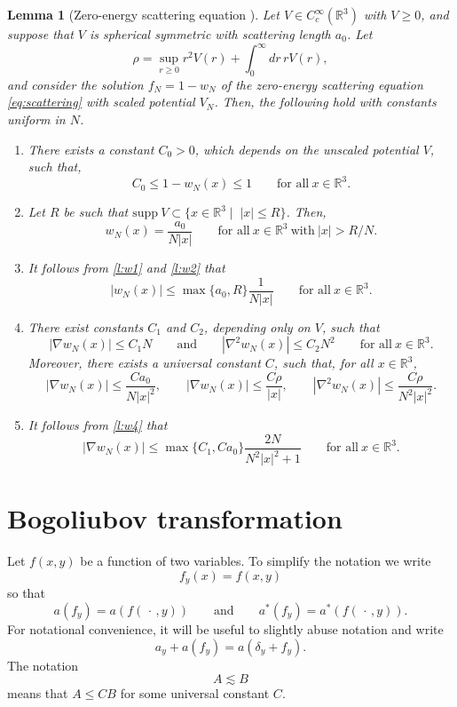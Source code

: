 \documentclass[11pt,a4paper]{scrartcl}
\newtheorem{lem}[thm]{Lemma}
\newcommand{\R}{\mathds{R}}
\begin{document}
\begin{lem}[Zero-energy scattering equation \cite{ESY2010}] \label{l:w}
  Let $V \in C_c^\infty(\R^3)$ with $V \ge 0$, and suppose that $V$ is
  spherical symmetric with scattering length $a_0$. Let
  \[
    \rho = \sup_{r \ge 0} r^2 V(r) + \int_0^\infty dr \, r V(r),
  \]
  and consider the solution $f_N = 1-w_N$ of the zero-energy scattering
  equation \eqref{eq:scattering} with scaled potential $V_N$. Then, the
  following hold with constants uniform in $N$.
  \begin{enumerate}
    \item \label{l:w1} There exists a constant $C_0 > 0$, which depends on the
      unscaled potential $V$, such that,
      \[
        C_0 \le 1 - w_N(x) \le 1 \qquad \text{for all} \ x \in \R^3.
      \]
    \item \label{l:w2} Let $R$ be such that $\text{supp} \ V \subset \{ x \in
      \R^3 \; | \;\; |x| \le R \}$. Then,
      \[
        w_N(x) = \frac{a_0}{N|x|} \qquad \text{for all} \ x \in \R^3 \
        \text{with} \ |x| > R/N.
      \]
    \item \label{l:w3} It follows from \ref{l:w1} and \ref{l:w2} that
      \[
        |w_N(x)| \le \max\{a_0, R\} \frac{1}{N|x|} \qquad \text{for all} \ x
        \in \R^3.
      \]
    \item \label{l:w4} There exist constants $C_1$ and $C_2$, depending only on
      $V$, such that
      \[
        |\nabla w_N(x)| \le C_1 N \qquad \text{and} \qquad | \nabla^2 w_N(x)|
        \le C_2 N^2 \qquad \text{for all} \ x \in \R^3.
      \]
      Moreover, there exists a universal constant $C$, such that, for all $x
      \in \R^3$,
      \[
        |\nabla w_N(x)| \le \frac{C a_0}{N |x|^2}, \qquad |\nabla w_N(x)| \le
        \frac{C \rho}{|x|}, \qquad |\nabla^2 w_N(x)| \le \frac{C \rho}{N^2
        |x|^2}.
      \]
    \item \label{l:w5} It follows from \ref{l:w4} that
      \[
        |\nabla w_N(x)| \le \max\{ C_1, C a_0 \} \frac{2N}{N^2|x|^2 + 1}
        \qquad \text{for all} \ x \in \R^3.
      \]
  \end{enumerate}
\end{lem}


\section{Bogoliubov transformation}


Let $f(x,y)$ be a function of two variables. To simplify the notation we write
\[
  f_y(x) = f(x,y)
\]
so that
\[
  a(f_y) = a(f(\,\cdot\,,y)) \qquad \text{and} \qquad a^*(f_y) =
  a^*(f(\,\cdot\,,y)).
\]
For notational convenience, it will be useful to slightly abuse notation and
write
\[
  a_y + a(f_y) = a(\delta_y + f_y).
\]
The notation
\[
  A \apprle B
\]
means that $A \le C B$ for some universal constant $C$.
\end{document}
